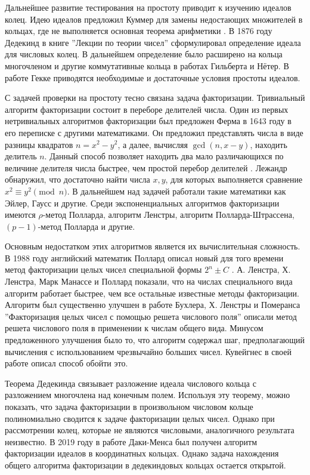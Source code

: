 \documentclass[_00_dissertation.tex]{subfiles}
\begin{document}
Дальнейшее развитие тестирования на простоту приводит к изучению идеалов колец.
Идею идеалов предложил Куммер для замены недостающих множителей в кольцах, где не выполняется основная теорема арифметики \cite{source:Stillwell}.
В 1876 году Дедекинд в книге ''Лекции по теории чисел''\cite{source:Dedekind} сформулировал определение идеала для числовых колец.
В дальнейшем определение было расширено на кольца многочленом и другие коммутативные кольца в работах Гильберта и Нётер.
В работе Гекке \cite{source:Gekke} приводятся необходимые и достаточные условия простоты идеалов.

С задачей проверки на простоту тесно связана задача факторизации.
Тривиальный алгоритм факторизации состоит в переборе делителей числа.
Один из первых нетривиальных алгоритмов факторизации был предложен Ферма в 1643 году в его переписке с другими математиками.
Он предложил представлять числа в виде разницы квадратов $n = x^2 - y^2$, а далее, вычисляя $\gcd(n,x-y)$, находить делитель $n$.
Данный способ позволяет находить два мало различающихся по величине делителя числа быстрее, чем простой перебор делителей \cite{source:Yaschenko}.
Лежандр обнаружил, что достаточно найти числа $x, y$, для которых выполняется сравнение $x^{2}\equiv y^{2}\pmod{n}$.
В дальнейшем над задачей работали такие математики как Эйлер, Гаусс и другие.
Среди экспоненциальных алгоритмов факторизации имеются $\rho$-метод Полларда, алгоритм Ленстры, алгоритм Полларда-Штрассена, $(p-1)$-метод Полларда и другие.

Основным недостатком этих алгоритмов является их вычислительная сложность.
В 1988 году английский математик Поллард описал новый для того времени метод факторизации целых чисел специальной формы $2^n \pm C$ \cite{source:Pollard}.
А. Ленстра, Х. Ленстра, Марк Манассе и Поллард показали, что на числах специального вида алгоритм работает быстрее, чем все остальные известные методы факторизации.
Алгоритм был существенно улучшен в работе Бухлера, Х. Ленстры и Померанса ''Факторизация целых чисел с помощью решета числового поля'' \cite{source:Buhler} описали метод решета числового поля в применении к числам общего вида.
Минусом предложенного улучшения было то, что алгоритм содержал шаг, предполагающий вычисления с использованием чрезвычайно больших чисел.
Кувейгнес в своей работе \cite{source:Couveignes} описал способ обойти это.

Теорема Дедекинда связывает разложение идеала числового кольца с разложением многочлена над конечным полем.
Используя эту теорему, можно показать, что задача факторизации в произвольном числовом кольце полиномиально сводится к задаче факторизации целых чисел.
Однако при рассмотрении колец, которые не являются числовыми, аналогичного результата неизвестно.
В 2019 году в работе Даки-Менса \cite{source:Darkey-Mensah} был получен алгоритм факторизации идеалов в координатных кольцах.
Однако задача нахождения общего алгоритма факторизации в дедекиндовых кольцах остается открытой.
\end{document}
